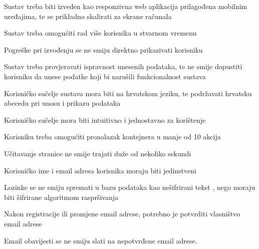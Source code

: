 			\begin{packed_item}
				\item Sustav treba biti izveden kao responzivna web aplikacija prilagođena mobilnim uređajima, te se prikladno skalirati za ekrane računala
				\item Sustav treba omogućiti rad više korisnika u stvarnom vremenu
				\item Pogreške pri izvođenju se ne smiju direktno prikazivati korisniku
				\item Sustav treba provjeravati ispravnost unesenih podataka, te ne smije dopustiti korisniku da unese podatke koji bi narušili funkcionalnost sustava
				\item Korisničko sučelje sustava mora biti na hrvatskom jeziku, te podržavati hrvatsku abecedu pri unosu i prikazu podataka
				\item Korisničko sučelje mora biti intuitivno i jednostavno za korištenje
				\item Korisniku treba omogućiti pronalazak kontejnera u manje od 10 akcija
				\item Učitavanje stranice ne smije trajati duže od nekoliko sekundi
				\\
				\item Korisničko ime i email adresa korisnika moraju biti jedinstveni
				\item Lozinke se ne smiju spremati u bazu podataka kao nešifrirani tekst , nego moraju biti šifrirane algoritmom raspršivanja
				\item Nakon registracije ili promjene email adrese, potrebno je potvrditi vlasništvo email adrese
				\item Email obavijesti se ne smiju slati na nepotvrđene email adrese.
			\end{packed_item}
			
			
			\clearpage
